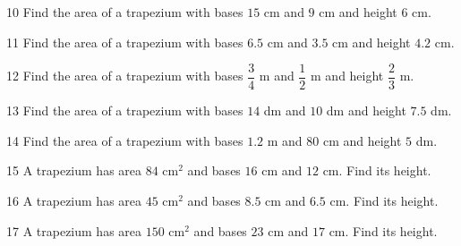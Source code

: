 \gap
\begin{probbox}{10}{\relax}
Find the area of a trapezium with bases $15$ cm and $9$ cm and height $6$ cm.
\end{probbox}
\gap
\begin{probbox}{11}{\relax}
Find the area of a trapezium with bases $6.5$ cm and $3.5$ cm and height $4.2$ cm.
\end{probbox}
\gap
\begin{probbox}{12}{\relax}
Find the area of a trapezium with bases $\dfrac34$ m and $\dfrac12$ m and height $\dfrac23$ m.
\end{probbox}
\gap
\begin{probbox}{13}{\relax}
Find the area of a trapezium with bases $14$ dm and $10$ dm and height $7.5$ dm.
\end{probbox}
\gap
\begin{probbox}{14}{\relax}
Find the area of a trapezium with bases $1.2$ m and $80$ cm and height $5$ dm.
\end{probbox}
\gap
\begin{probbox}{15}{\relax}
A trapezium has area $84$ cm$^2$ and bases $16$ cm and $12$ cm. Find its height.
\end{probbox}
\gap
\begin{probbox}{16}{\relax}
A trapezium has area $45$ cm$^2$ and bases $8.5$ cm and $6.5$ cm. Find its height.
\end{probbox}
\gap
\begin{probbox}{17}{\relax}
A trapezium has area $150$ cm$^2$ and bases $23$ cm and $17$ cm. Find its height.
\end{probbox}
